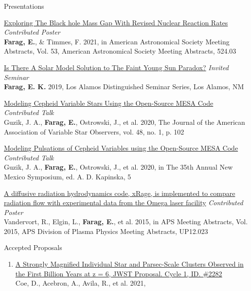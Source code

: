 \documentclass{resume} %
\begin{document}
\begin{rSection}{Presentations}
\begin{revnumerate}
\item \href{https://ui.adsabs.harvard.edu/abs/2021AAS...23752403F/abstract}{Exploring The Black hole Mass Gap With Revised Nuclear Reaction Rates} \hfill {\em Contributed Poster}
\\ \textbf{Farag, E.}, \& Timmes, F. 2021, in American Astronomical Society Meeting Abstracts, Vol. 53, American Astronomical Society Meeting Abstracts, 524.03


\item \href{https://doi.org/10.2172/1545733}{Is There A Solar Model Solution to The Faint Young Sun Paradox?} \hfill {\em Invited Seminar}
\\ \textbf{Farag, E. K.} 2019, Los Alamos Distinguished Seminar Series, Los Alamos, NM 


\item \href{https://ui.adsabs.harvard.edu/abs/2020JAVSO..48..102G/abstract}{Modeling Cepheid Variable Stars Using the Open-Source MESA Code} \hfill {\em Contributed Talk}
\\ Guzik, J. A., \textbf{Farag, E.}, Ostrowski, J., et al. 2020, The Journal of the American Association of Variable Star Observers, vol. 48, no. 1, p. 102


\item \href{https://ui.adsabs.harvard.edu/abs/2020anms.conf....5G/abstract}{Modeling Pulsations of Cepheid Variables using the Open-Source MESA Code} \hfill {\em Contributed Talk}
\\ Guzik, J. A., \textbf{Farag, E.}, Ostrowski, J., et al. 2020, in The 35th Annual New Mexico Symposium, ed. A. D. Kapinska, 5


\item \href{https://ui.adsabs.harvard.edu/abs/2015APS..DPPUP2023V/abstract}{A diffusive radiation hydrodynamics code, xRage, is implemented to compare radiation flow with experimental data from the Omega laser facility} \hfill {\em Contributed Poster}
\\ Vandervort, R., Elgin, L., \textbf{Farag, E.}, et al. 2015, in APS Meeting Abstracts, Vol. 2015, APS Division of Plasma Physics Meeting Abstracts, UP12.023


\end{revnumerate}
\end{rSection}



\begin{rSection}{Accepted Proposals}
\begin{enumerate}
    \item \href{https://ui.adsabs.harvard.edu/abs/2021hst..prop16668C/abstract}{A Strongly Magnified Individual Star and Parsec-Scale Clusters Observed in the First Billion Years at z = 6, JWST Proposal. Cycle 1, ID. \#2282}
    \\ Coe, D., Acebron, A., Avila, R., et al. 2021,  
\end{enumerate}    
\end{rSection}
\end{document}
